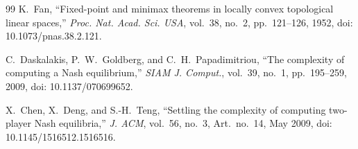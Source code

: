 \documentclass[11pt]{article}
\theoremstyle{definition}
\theoremstyle{remark}
\begin{document}
\begin{thebibliography}{99}
K.~Fan, ``Fixed-point and minimax theorems in locally convex topological linear spaces,'' \emph{Proc. Nat. Acad. Sci. USA}, vol.~38, no.~2, pp.~121--126, 1952, doi: 10.1073/pnas.38.2.121.

C.~Daskalakis, P.~W.~Goldberg, and C.~H.~Papadimitriou, ``The complexity of computing a Nash equilibrium,'' \emph{SIAM J. Comput.}, vol.~39, no.~1, pp.~195--259, 2009, doi: 10.1137/070699652.

X.~Chen, X.~Deng, and S.-H.~Teng, ``Settling the complexity of computing two-player Nash equilibria,'' \emph{J. ACM}, vol.~56, no.~3, Art.~no.~14, May 2009, doi: 10.1145/1516512.1516516.

\end{thebibliography}
\end{document}
